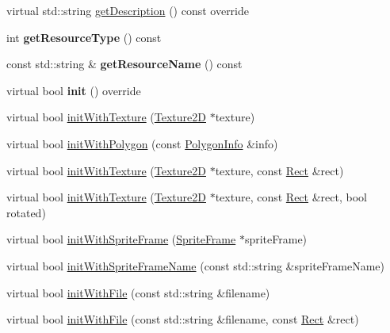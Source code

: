 \begin{DoxyCompactItemize}
\item 
virtual std\+::string \hyperlink{classSprite_af35014afbb571e3781023322613b695b}{get\+Description} () const override
\item 
\mbox{\label{classSprite_a9e607bfde5d4f8e6a66bb5c8b0351522}} 
int {\bfseries get\+Resource\+Type} () const
\item 
\mbox{\label{classSprite_aa08e90540dd460e580ee0ccbd1119fe1}} 
const std\+::string \& {\bfseries get\+Resource\+Name} () const
\item 
\mbox{\label{classSprite_a8839dd001002927b7f54193aff705f15}} 
virtual bool {\bfseries init} () override
\item 
virtual bool \hyperlink{classSprite_ab1786f8ea100d33fd7e86dc1330a3514}{init\+With\+Texture} (\hyperlink{classTexture2D}{Texture2D} $\ast$texture)
\item 
virtual bool \hyperlink{classSprite_ad2f432b077c8e919ca9e20c34e8610f8}{init\+With\+Polygon} (const \hyperlink{classPolygonInfo}{Polygon\+Info} \&info)
\item 
virtual bool \hyperlink{classSprite_a01ecfdcf88ff72dc1eed9f270405aa41}{init\+With\+Texture} (\hyperlink{classTexture2D}{Texture2D} $\ast$texture, const \hyperlink{classRect}{Rect} \&rect)
\item 
virtual bool \hyperlink{classSprite_a30295e474da1a9c11ebe97f04a6a49fc}{init\+With\+Texture} (\hyperlink{classTexture2D}{Texture2D} $\ast$texture, const \hyperlink{classRect}{Rect} \&rect, bool rotated)
\item 
virtual bool \hyperlink{classSprite_ab677ce26c6a82876396b0a8ac5c16704}{init\+With\+Sprite\+Frame} (\hyperlink{classSpriteFrame}{Sprite\+Frame} $\ast$sprite\+Frame)
\item 
virtual bool \hyperlink{classSprite_ae071a06f28d584ed403c3ea0f67d8ddd}{init\+With\+Sprite\+Frame\+Name} (const std\+::string \&sprite\+Frame\+Name)
\item 
virtual bool \hyperlink{classSprite_a4b3471b589c26f4a6b005a50f77db9e8}{init\+With\+File} (const std\+::string \&filename)
\item 
virtual bool \hyperlink{classSprite_afe60b77e359cc2363b14eb80a6fb4068}{init\+With\+File} (const std\+::string \&filename, const \hyperlink{classRect}{Rect} \&rect)
\end{DoxyCompactItemize}
